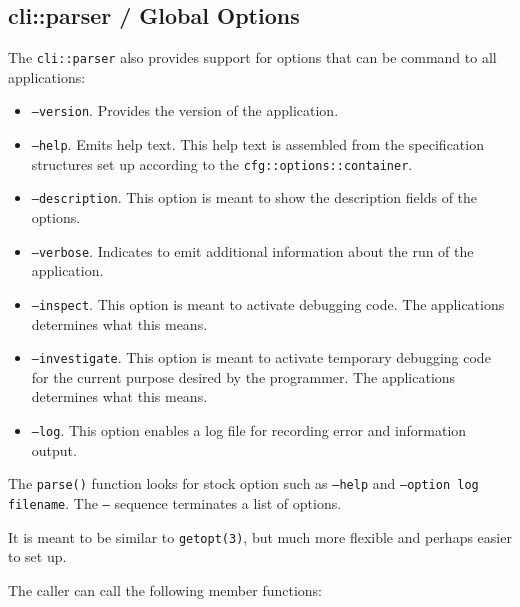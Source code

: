 \subsection{cli::parser / Global Options}
\label{subsec:cli_namespace_parser_global_options}

   The \texttt{cli::parser} also provides support for options that can
   be command to all applications:

   \begin{itemize}
      \item \texttt{--version}.
         Provides the version of the application.
      \item \texttt{--help}.
         Emits help text. This help text is assembled from
         the specification structures set up according to the
         \texttt{cfg::options::container}.
      \item \texttt{--description}.
         This option is meant to show the description fields of the
         options.
      \item \texttt{--verbose}.
         Indicates to emit additional information about the run of the
         application.
      \item \texttt{--inspect}.
         This option is meant to activate debugging code.
         The applications determines what this means.
      \item \texttt{--investigate}.
         This option is meant to activate temporary debugging code for
         the current purpose desired by the programmer.
         The applications determines what this means.
      \item \texttt{--log}.
         This option enables a log file for recording error and information
         output.
   \end{itemize}

   The \texttt{parse()} function looks for stock option such as
   \texttt{--help} and \texttt{--option log filename}.
   The \texttt{--} sequence terminates a list of options.

   It is meant to be similar to \texttt{getopt(3)}, but much more flexible and
   perhaps easier to set up.

   The caller can call the following member functions:


